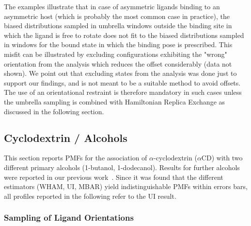 \documentclass[9pt,lessons,pubversion]{livecoms}
\begin{document}
The examples illustrate that in case of asymmetric ligands binding to an asymmetric host (which is probably the most common case in practice), 
the biased distributions sampled in umbrella windows outside the binding site in which the ligand is free to rotate does not fit to the biased distributions sampled in windows for the bound state 
in which the binding pose is prescribed. This misfit can be illustrated by excluding configurations exhibiting the "wrong" orientation from the analysis which reduces the offset considerably (data not shown). 
We point out that excluding states from the analysis was done just to support our findings, and is not meant to be a suitable method to avoid offsets. 
The use of an orientational restraint is therefore mandatory in such cases unless the umbrella sampling is combined with Hamiltonian Replica Exchange as discussed in the following section.

\subsection{Cyclodextrin / Alcohols}
\label{sec:application}

This section reports PMFs for the association of $\alpha$-cyclodextrin ($\alpha$CD) with two different primary alcohols (1-butanol, 1-dodecanol).
Results for further alcohols were reported in our previous work~\cite{markthaler2017molecular}.
Since it was found that the different estimators (WHAM, UI, MBAR) yield indistinguishable PMFs within errors bars, all profiles reported in the following refer to the UI result.

\subsubsection*{Sampling of Ligand Orientations}
\end{document}
